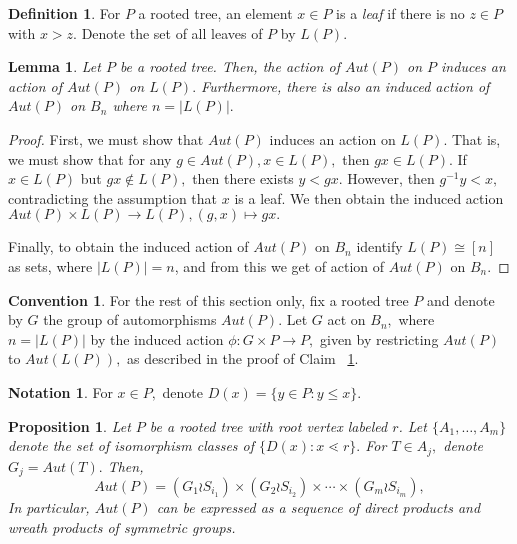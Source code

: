 \documentclass[10 pt]{amsart}
\theoremstyle{plain}
\newtheorem{prop}[thm]{Proposition}
\newtheorem{lem}[thm]{Lemma}
\theoremstyle{definition}
\newtheorem{defn}[thm]{Definition}
\newtheorem{note}[thm]{Notation}
\newtheorem{convention}[thm]{Convention}
\theoremstyle{remark}
\numberwithin{equation}{section}
\begin{document}
\begin{defn}
For $P$ a rooted tree, an element $x \in P$ is a {\it leaf} if there is no $z \in P$ with $x > z.$ Denote the set of all leaves of $P$ by $L(P).$
\end{defn}

\begin{lem}
\label{lem:induced_tree_action}
Let $P$ be a rooted tree. Then, the action of $Aut(P)$ on $P$ induces an action of $Aut(P)$ on $L(P).$ Furthermore, there is also an induced action of $Aut(P)$ on $B_n$ where $n = |L(P)|.$ 
\end{lem}
\begin{proof}
First, we must show that $Aut(P)$ induces an action on $L(P).$ That is, we must show that for any $g \in Aut(P),x \in L(P),$ then $gx \in L(P).$ If $x \in L(P)$ but $gx \notin L(P),$ then there exists $y < gx.$ However, then $g^{-1}y < x,$ contradicting the assumption that $x$ is a leaf. We then obtain the induced action $Aut(P)\times L(P) \rightarrow L(P),(g,x)\mapsto gx.$

Finally, to obtain the induced action of $Aut(P)$ on $B_n$ identify $L(P) \cong [n]$ as sets, where $|L(P)| = n$, and from this we get of action of $Aut(P)$ on $B_n.$
\end{proof}

\begin{convention}
For the rest of this section only, fix a rooted tree $P$ and denote by $G$ the group of automorphisms $Aut(P).$ Let $G$ act on $B_n,$ where $n = |L(P)|$ by the induced action $\phi:G \times P \rightarrow P,$ given by restricting $Aut(P)$ to $Aut(L(P)),$ as described in the proof of Claim ~\ref{lem:induced_tree_action}.
\end{convention}

\begin{note}
For $x \in P,$ denote $D(x) = \{y \in P: y \leq x\}.$
\end{note}
\begin{prop}
\label{prop:automorphism_trees}
Let $P$ be a rooted tree with root vertex labeled $r$. Let $\{A_1,\ldots,A_m\}$ denote the set of isomorphism classes of $\{D(x):x\lessdot r\}.$ For $T \in A_j,$ denote $G_j = Aut(T).$ Then, 
\begin{equation}
\label{eq:level_expansion}
Aut(P) = (G_1 \wr S_{i_1}) \times (G_2 \wr S_{i_2}) \times \cdots \times (G_m\wr S_{i_m}),
\end{equation}
In particular, $Aut(P)$ can be expressed as a sequence of direct products and wreath products of symmetric groups.
\end{prop}
\end{document}
